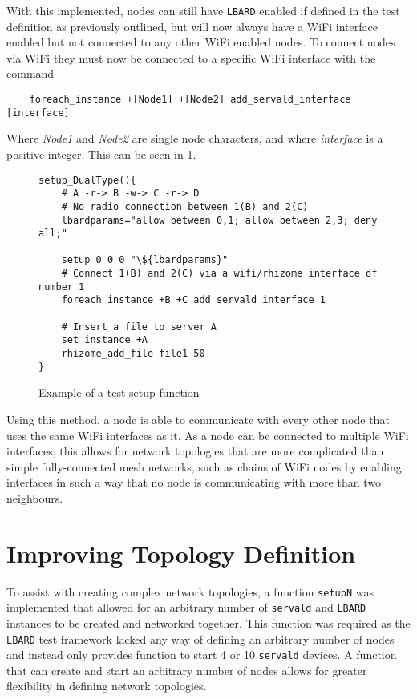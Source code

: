 With this implemented, nodes can still have \texttt{LBARD} enabled if defined in the test definition as previously outlined, but will now always have a WiFi interface enabled but not connected to any other WiFi enabled nodes.
To connect nodes via WiFi they must now be connected to a specific WiFi interface with the command
\begin{lstlisting}
    foreach_instance +[Node1] +[Node2] add_servald_interface [interface]
\end{lstlisting}
Where \emph{Node1} and \emph{Node2} are single node characters, and where \emph{interface} is a positive integer.
This can be seen in \figurename{ \ref{fig:definingInterfaces}}.

\lstset{language=bash,
showstringspaces=false,
numbers=left,
}

\begin{figure}[h!]
    \begin{centering}
        \begin{lstlisting}[breaklines, frame=single]
setup_DualType(){
    # A -r-> B -w-> C -r-> D
    # No radio connection between 1(B) and 2(C)
    lbardparams="allow between 0,1; allow between 2,3; deny all;"

    setup 0 0 0 "\${lbardparams}"
    # Connect 1(B) and 2(C) via a wifi/rhizome interface of number 1
    foreach_instance +B +C add_servald_interface 1

    # Insert a file to server A
    set_instance +A
    rhizome_add_file file1 50
}
        \end{lstlisting}
        \caption{Example of a test setup function}
        \label{fig:definingInterfaces}
    \end{centering}
\end{figure}

Using this method, a node is able to communicate with every other node that uses the same WiFi interfaces as it.
As a node can be connected to multiple WiFi interfaces, this allows for network topologies that are more complicated than simple fully-connected mesh networks, such as chains of WiFi nodes by enabling interfaces in such a way that no node is communicating with more than two neighbours.


\section{Improving Topology Definition}
To assist with creating complex network topologies, a function \texttt{setupN} was implemented that allowed for an arbitrary number of \texttt{servald} and \texttt{LBARD} instances to be created and networked together.
This function was required as the \texttt{LBARD} test framework lacked any way of defining an arbitrary number of nodes and instead only provides function to start 4 or 10 \texttt{servald} devices.
A function that can create and start an arbitrary number of nodes allows for greater flexibility in defining network topologies.

